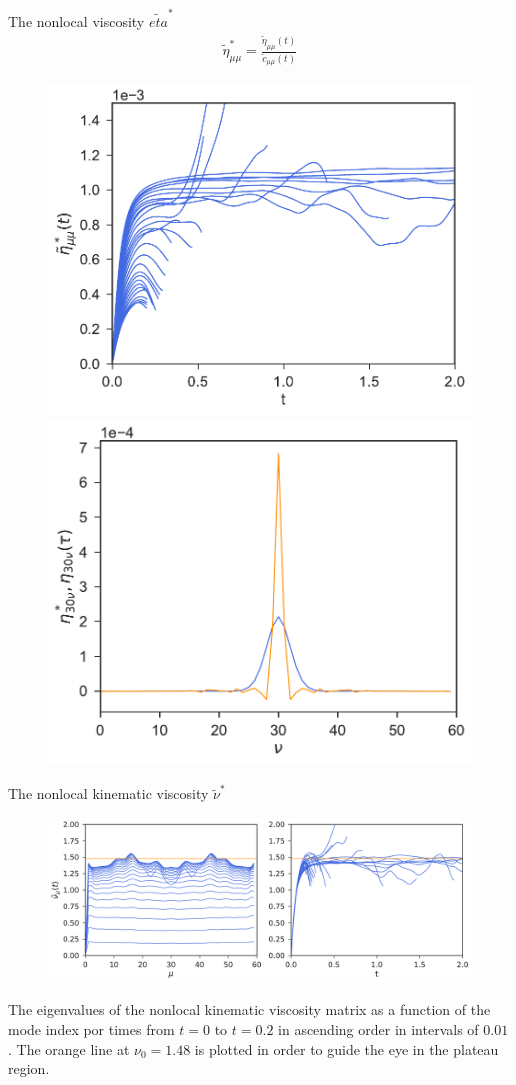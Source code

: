 \documentclass{beamer}
\begin{document}
\begin{frame}{The nonlocal viscosity $\tilde{eta}^*$}
  \begin{align}
  \tilde{\eta}^*_{\mu\mu}=\frac{\tilde{\eta}_{\mu\mu}(t)}{\tilde{c}_{\mu\mu}(t)}
  \nonumber
  \end{align}
\begin{figure}[h!]
\includegraphics[width=0.5\linewidth]{EtaStartFourier-PBC}
\includegraphics[width=0.5\linewidth]{CompareEtas-PBC}
\end{figure}
\end{frame}

\begin{frame}{The nonlocal kinematic viscosity $\tilde{\nu}^*$}
\begin{figure}[h!]
\includegraphics[width=\linewidth]{KinVisctFourier-PBC}
\end{figure}
The eigenvalues of the nonlocal kinematic viscosity matrix as a function of the mode index por times from $t=0$ to $t=0.2$ in ascending order in intervals of $0.01$. The orange line at $\nu_0=1.48$ is plotted in order to guide the eye in the plateau region.
\end{frame}
\end{document}

